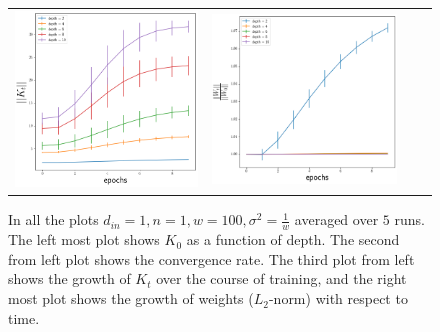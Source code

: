\begin{figure}[h]
{\begin{tabular}{cccc}
\includegraphics[scale=0.4]{figs/dln-gram.png}
&
\includegraphics[scale=0.4]{figs/dln-norm.png}
\end{tabular}
}
\caption{In all the plots $d_{in}=1, n=1, w=100,\sigma^2=\frac{1}{w}$ averaged over $5$ runs. The left most plot shows $K_0$ as a function of depth. The second from left plot shows the convergence rate. The third plot from left shows the growth of $K_t$ over the course of training, and the right most plot shows the growth of weights ($L_2$-norm) with respect to time.}
\label{fig:dln}
\end{figure}

